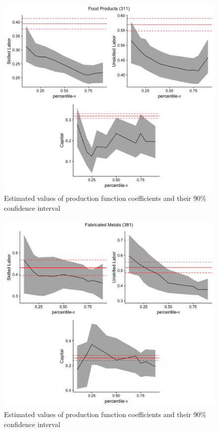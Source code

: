 \documentclass[11pt]{article}
\begin{document}
\begin{figure}[H]
\centering
\caption{Estimated values of production function coefficients and their 90\% confidence interval}
\includegraphics[width=12cm]{Coefficient_Plot_1.png}
\end{figure}

\begin{figure}[H]
\centering
\caption{Estimated values of production function coefficients and their 90\% confidence interval}
\includegraphics[width=12cm]{Coefficient_Plot_2.png}
\end{figure}
\end{document}
